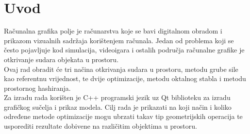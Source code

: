 \chapter{Uvod}

Računalna grafika polje je računarstva koje se bavi digitalnom obradom i prikazom
vizualnih sadržaja korištenjem računala. Jedan od problema koji se često pojavljuje
kod simulacija, videoigara i ostalih područja računalne grafike je otkrivanje sudara
objekata u prostoru.\\
Ovaj rad obradit će tri načina otkrivanja sudara u prostoru, metodu grube sile kao
referentnu vrijednost, te dvije optimizacije, metodu oktalnog stabla i metodu prostornog
hashiranja.\\
Za izradu rada korišten je C++ programski jezik uz Qt biblioteku za izradu grafičkog sučelja
i prikaz modela. Cilj rada je prikazati na koji način i koliko određene metode optimizacije
mogu ubrzati takav tip geometrijskih operacija te usporediti rezultate dobivene na različitim
objektima u prostoru.
